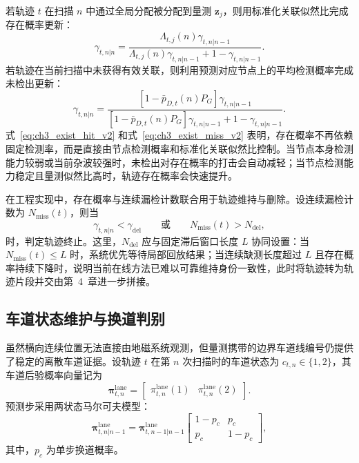 \documentclass{xdupgthesis}
\begin{document}
若轨迹 $t$ 在扫描 $n$ 中通过全局分配被分配到量测 $\mathbf z_j$，则用标准化关联似然比完成存在概率更新：
\begin{equation}
	\gamma_{t,n|n}=
	\frac{\Lambda_{t,j}(n)\gamma_{t,n|n-1}}{\Lambda_{t,j}(n)\gamma_{t,n|n-1}+1-\gamma_{t,n|n-1}}.
	\label{eq:ch3_exist_hit_v2}
\end{equation}
若轨迹在当前扫描中未获得有效关联，则利用预测对应节点上的平均检测概率完成未检出更新：
\begin{equation}
	\gamma_{t,n|n}=
	\frac{\left[1-\bar p_{D,t}(n)P_G\right]\gamma_{t,n|n-1}}{\left[1-\bar p_{D,t}(n)P_G\right]\gamma_{t,n|n-1}+1-\gamma_{t,n|n-1}}.
	\label{eq:ch3_exist_miss_v2}
\end{equation}
式~\eqref{eq:ch3_exist_hit_v2} 和式~\eqref{eq:ch3_exist_miss_v2} 表明，存在概率不再依赖固定检测率，而是直接由节点检测概率和标准化关联似然比控制。当节点本身检测能力较弱或当前杂波较强时，未检出对存在概率的打击会自动减轻；当节点检测能力稳定且量测似然比高时，轨迹存在概率会快速提升。

在工程实现中，存在概率与连续漏检计数联合用于轨迹维持与删除。设连续漏检计数为 $N_{\mathrm{miss}}(t)$，则当
\begin{equation}
	\gamma_{t,n|n}<\gamma_{\mathrm{del}}
	\qquad\text{或}\qquad
	N_{\mathrm{miss}}(t)>N_{\mathrm{del}},
	\label{eq:ch3_delete_v2}
\end{equation}
时，判定轨迹终止。这里，$N_{\mathrm{del}}$ 应与固定滞后窗口长度 $L$ 协同设置：当 $N_{\mathrm{miss}}(t)\le L$ 时，系统优先等待局部回放结果；当连续缺测长度超过 $L$ 且存在概率持续下降时，说明当前在线方法已难以可靠维持身份一致性，此时将轨迹转为轨迹片段并交由第~4~章进一步拼接。

\subsection{车道状态维护与换道判别}

虽然横向连续位置无法直接由地磁系统观测，但量测携带的边界车道线编号仍提供了稳定的离散车道证据。设轨迹 $t$ 在第 $n$ 次扫描时的车道状态为 $c_{t,n}\in\{1,2\}$，其车道后验概率向量记为
\begin{equation}
	\boldsymbol\pi_{t,n}^{\mathrm{lane}}=
	\begin{bmatrix}
		\pi_{t,n}^{\mathrm{lane}}(1) &
		\pi_{t,n}^{\mathrm{lane}}(2)
	\end{bmatrix}.
	\label{eq:ch3_lane_vector_v2}
\end{equation}
预测步采用两状态马尔可夫模型：
\begin{equation}
	\boldsymbol\pi_{t,n|n-1}^{\mathrm{lane}}
	=
	\boldsymbol\pi_{t,n-1|n-1}^{\mathrm{lane}}
	\begin{bmatrix}
		1-p_c & p_c\\
		p_c & 1-p_c
	\end{bmatrix},
	\label{eq:ch3_lane_predict_v2}
\end{equation}
其中，$p_c$ 为单步换道概率。
\end{document}
